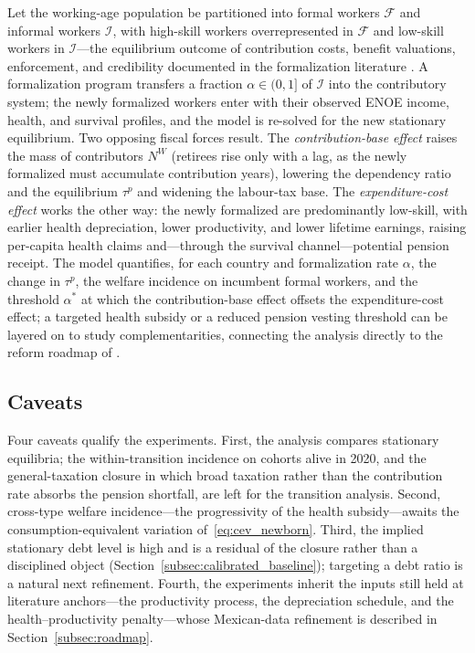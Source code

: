 \documentclass[12pt,a4paper]{article}
\begin{document}
Let the working-age population be partitioned into formal workers $\mathcal{F}$ and informal workers $\mathcal{I}$, with high-skill workers overrepresented in $\mathcal{F}$ and low-skill workers in $\mathcal{I}$---the equilibrium outcome of contribution costs, benefit valuations, enforcement, and credibility documented in the formalization literature \citep{WorldBankInformalizing2025, BoschMelguizoPages2013}. A formalization program transfers a fraction $\alpha\in(0,1]$ of $\mathcal{I}$ into the contributory system; the newly formalized workers enter with their observed ENOE income, health, and survival profiles, and the model is re-solved for the new stationary equilibrium. Two opposing fiscal forces result. The \emph{contribution-base effect} raises the mass of contributors $N^W$ (retirees rise only with a lag, as the newly formalized must accumulate contribution years), lowering the dependency ratio and the equilibrium $\tau^p$ and widening the labour-tax base. The \emph{expenditure-cost effect} works the other way: the newly formalized are predominantly low-skill, with earlier health depreciation, lower productivity, and lower lifetime earnings, raising per-capita health claims and---through the survival channel---potential pension receipt. The model quantifies, for each country and formalization rate $\alpha$, the change in $\tau^p$, the welfare incidence on incumbent formal workers, and the threshold $\alpha^*$ at which the contribution-base effect offsets the expenditure-cost effect; a targeted health subsidy or a reduced pension vesting threshold can be layered on to study complementarities, connecting the analysis directly to the reform roadmap of \citet{WorldBankInformalizing2025}.

\subsection{Caveats}
\label{subsec:exp_caveats}

Four caveats qualify the experiments. First, the analysis compares stationary equilibria; the within-transition incidence on cohorts alive in 2020, and the general-taxation closure in which broad taxation rather than the contribution rate absorbs the pension shortfall, are left for the transition analysis. Second, cross-type welfare incidence---the progressivity of the health subsidy---awaits the consumption-equivalent variation of~\eqref{eq:cev_newborn}. Third, the implied stationary debt level is high and is a residual of the closure rather than a disciplined object (Section~\ref{subsec:calibrated_baseline}); targeting a debt ratio is a natural next refinement. Fourth, the experiments inherit the inputs still held at literature anchors---the productivity process, the depreciation schedule, and the health--productivity penalty---whose Mexican-data refinement is described in Section~\ref{subsec:roadmap}.
\end{document}
